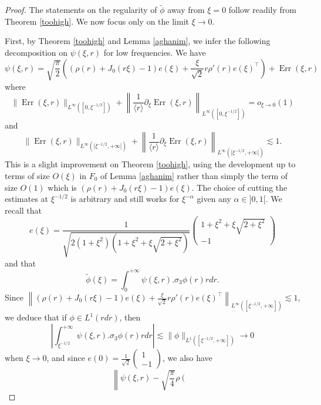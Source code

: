 \documentclass[11 pt]{amsart}
\newcommand{\tmop}[1]{\ensuremath{\operatorname{#1}}}
\theoremstyle{definition}
\theoremstyle{remark}
\numberwithin{equation}{section}
\begin{document}
\begin{proof}
The statements on the regularity of $\widetilde{\phi}$ away from $\xi = 0$ follow readily from Theorem \ref{toohigh}. We now focus only on the limit $\xi
  \rightarrow 0$.
  
  First, by Theorem \ref{toohigh} and Lemma \ref{aghanim}, we infer the
  following decomposition on $\psi (\xi, r)$ for low frequencies. We have
  \[ \psi (\xi, r) = \sqrt{\frac{\pi}{2}} \left( (\rho (r) + J_0 (r \xi) - 1)
     e (\xi) + \frac{\xi}{\sqrt{2}} r \rho' (r) e (\xi)^{\top} \right) +
     \tmop{Err} (\xi, r) \]
  where
  \[ \| \tmop{Err} (\xi, r) \|_{L^{\infty} ([0, \xi^{- 1 / 2}])} + \left\|
     \frac{1}{\langle r \rangle} \partial_{\xi} \tmop{Err} (\xi, r)
     \right\|_{L^{\infty} ([0, \xi^{- 1 / 2}])} = o_{\xi \rightarrow 0} (1) \]
  and
  \[ \| \tmop{Err} (\xi, r) \|_{L^{\infty} ([\xi^{- 1 / 2}, + \infty [)} +
     \left\| \frac{1}{\langle r \rangle} \partial_{\xi} \tmop{Err} (\xi, r)
     \right\|_{L^{\infty} ([\xi^{- 1 / 2}, + \infty [)} \lesssim 1. \]
  This is a slight improvement on Theorem \ref{toohigh}, using the development
  up to terms of size $O (\xi)$ in $F_0$ of Lemma \ref{aghanim} rather than
  simply the term of size $O (1)$ which is $(\rho (r) + J_0 (r \xi) - 1) e
  (\xi)$. The choice of cutting the estimates at $\xi^{- 1 / 2}$ is arbitrary
  and still works for $\xi^{- \alpha}$ given any $\alpha \in] 0, 1 [$. We
  recall that
  \[ e (\xi) = \frac{1}{\sqrt{2 (1 + \xi^2) \left( 1 + \xi^2 + \xi \sqrt{2 +
     \xi^2} \right)}} \left(\begin{array}{c}
       1 + \xi^2 + \xi \sqrt{2 + \xi^2}\\
       - 1
     \end{array}\right) \]
  and that
  \[ \widetilde{\phi} (\xi) = \int_0^{+ \infty} \psi (\xi, r) . \sigma_3 \phi (r)
     r d r. \]
  Since $\left\| (\rho (r) + J_0 (r \xi) - 1) e (\xi) + \frac{\xi}{\sqrt{2}} r
  \rho' (r) e (\xi)^{\top} \right\|_{L^{\infty} ([\xi^{- 1 / 2}, + \infty])}
  \lesssim 1$, we deduce that if $\phi \in L^1 (r d r)$, then
  \[ \left| \int_{\xi^{- 1 / 2}}^{+ \infty} \psi (\xi, r) . \sigma_3 \phi (r)
     r d r \right| \lesssim \| \phi \|_{L^1 ([\xi^{- 1 / 2}, + \infty])}
     \rightarrow 0 \]
  when $\xi \rightarrow 0$, and since $e (0) = \frac{1}{\sqrt{2}}
  \left(\begin{array}{c}
    1\\
    - 1
  \end{array}\right)$, we also have
  \[ \left\| \psi (\xi, r) - \sqrt{\frac{\pi}{4}} \rho \left(\begin{array}{c}

\end{array}\]
\end{proof}
\end{document}
